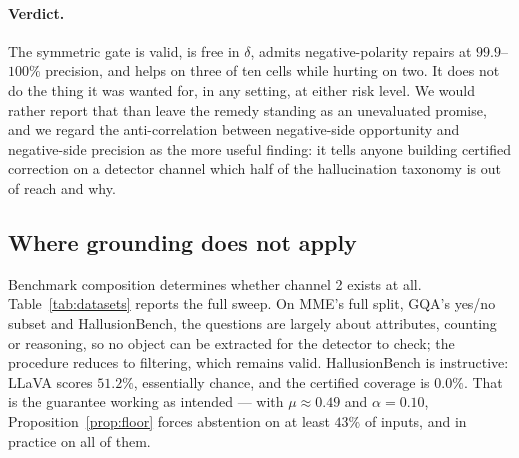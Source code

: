 \documentclass[review,number,doubleblind]{elsarticle}
\theoremstyle{plain}
\theoremstyle{definition}
\theoremstyle{remark}
\begin{document}
\paragraph{Verdict.}
The symmetric gate is valid, is free in $\delta$, admits negative-polarity repairs at
$99.9$--$100\%$ precision, and helps on three of ten cells while hurting on two. It does not do
the thing it was wanted for, in any setting, at either risk level. We would rather report that
than leave the remedy standing as an unevaluated promise, and we regard the anti-correlation
between negative-side opportunity and negative-side precision as the more useful finding: it
tells anyone building certified correction on a detector channel which half of the hallucination
taxonomy is out of reach and why.

\subsection{Where grounding does not apply}
\label{sec:exp:noapply}

Benchmark composition determines whether channel 2 exists at all.
Table~\ref{tab:datasets} reports the full sweep. On MME's full split, GQA's yes/no subset
and HallusionBench, the questions are largely about attributes, counting or reasoning, so no
object can be extracted for the detector to check; the procedure reduces to filtering, which
remains valid. HallusionBench is instructive: LLaVA scores $51.2\%$, essentially chance, and
the certified coverage is $0.0\%$. That is the guarantee working as intended --- with
$\mu\approx0.49$ and $\alpha=0.10$, Proposition~\ref{prop:floor} forces abstention on at
least $43\%$ of inputs, and in practice on all of them.
\end{document}
